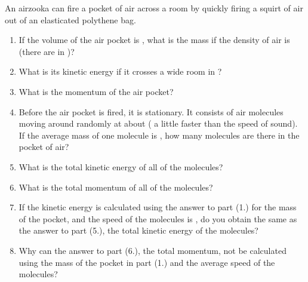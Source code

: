 
\begin{problem}[Robin9]
{An airzooka can fire a pocket of air across a room by quickly firing a squirt of air out of an elasticated polythene bag. 
\begin{enumerate}
	\item If the volume of the air pocket is , what is the mass if the density of air is  (there are  in )?
	\item What is its kinetic energy if it crosses a  wide room in ?
	\item What is the momentum of the air pocket?
	\item Before the air pocket is fired, it is stationary.  It consists of air molecules moving around randomly at about  ( a little faster than the speed of sound).  If the average mass of one molecule is , how many molecules are there in the  pocket of air?
	\item What is the total kinetic energy of all of the molecules?
	\item What is the total momentum of all of the molecules?
	\item If the kinetic energy is calculated using the answer to part (1.) for the mass of the pocket, and the speed of the molecules is , do you obtain the same as the answer to part (5.), the total kinetic energy of the molecules?
	\item Why can the answer to part (6.), the total momentum, not be calculated using the mass of the pocket in part (1.) and the  average speed of the molecules?
\end{enumerate}
}
{}
{}
\end{problem}